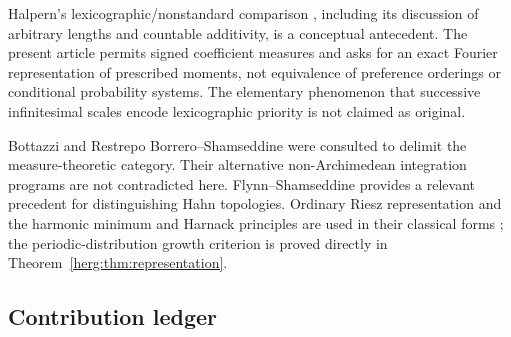 \documentclass[11pt,letterpaper]{article}
\theoremstyle{definition}
\numberwithin{equation}{section}
\begin{document}
Halpern's lexicographic/nonstandard comparison \cite{Halpern}, including its discussion of arbitrary lengths and countable additivity, is a conceptual antecedent. The present article permits signed coefficient measures and asks for an exact Fourier representation of prescribed moments, not equivalence of preference orderings or conditional probability systems. The elementary phenomenon that successive infinitesimal scales encode lexicographic priority is not claimed as original.

Bottazzi \cite{Bottazzi} and Restrepo Borrero--Shamseddine \cite{Restrepo} were consulted to delimit the measure-theoretic category. Their alternative non-Archimedean integration programs are not contradicted here. Flynn--Shamseddine \cite{Flynn} provides a relevant precedent for distinguishing Hahn topologies. Ordinary Riesz representation and the harmonic minimum and Harnack principles are used in their classical forms \cite{Rudin}; the periodic-distribution growth criterion is proved directly in Theorem~\ref{herg:thm:representation}.

\subsection{Contribution ledger}
\end{document}

